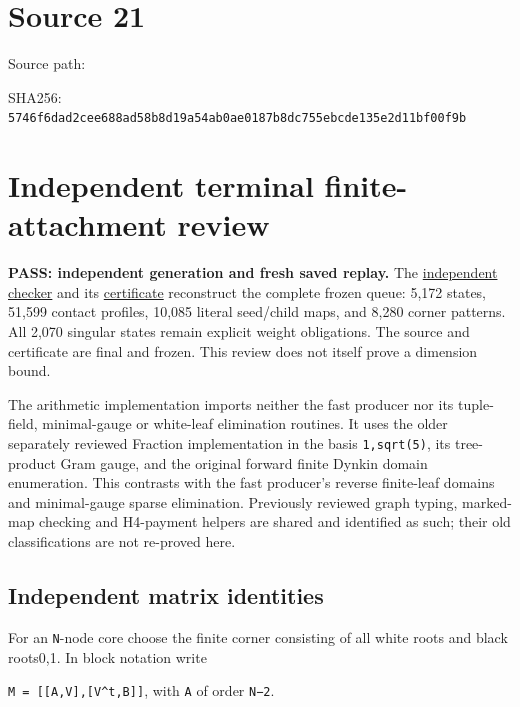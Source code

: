 \documentclass[
  10pt,
]{report}
\begin{document}
\clearpage

\chapter{Source 21}\label{source-21}

Source path:

SHA256:
\nolinkurl{5746f6dad2cee688ad58b8d19a54ab0ae0187b8dc755ebcde135e2d11bf00f9b}

\chapter{Independent terminal finite-attachment
review}\label{independent-terminal-finite-attachment-review}

\textbf{PASS: independent generation and fresh saved replay.} The
\href{../scripts/fresh_sqrt5_nonsingular_rank29_fast_20261015_review.py}{independent
checker} and its
\href{fresh_sqrt5_nonsingular_rank29_fast_20261015_review.json}{certificate}
reconstruct the complete frozen queue: 5,172 states, 51,599 contact
profiles, 10,085 literal seed/child maps, and 8,280 corner patterns. All
2,070 singular states remain explicit weight obligations. The source and
certificate are final and frozen. This review does not itself prove a
dimension bound.

The arithmetic implementation imports neither the fast producer nor its
tuple-field, minimal-gauge or white-leaf elimination routines. It uses
the older separately reviewed Fraction implementation in the basis
\texttt{1,sqrt(5)}, its tree-product Gram gauge, and the original
forward finite Dynkin domain enumeration. This contrasts with the fast
producer's reverse finite-leaf domains and minimal-gauge sparse
elimination. Previously reviewed graph typing, marked-map checking and
H4-payment helpers are shared and identified as such; their old
classifications are not re-proved here.

\section{Independent matrix
identities}\label{independent-matrix-identities}

For an \texttt{N}-node core choose the finite corner consisting of all
white roots and black roots0,1. In block notation write

\texttt{M\ =\ {[}{[}A,V{]},{[}V\^{}t,B{]}{]}}, with \texttt{A} of order
\texttt{N−2}.
\end{document}
